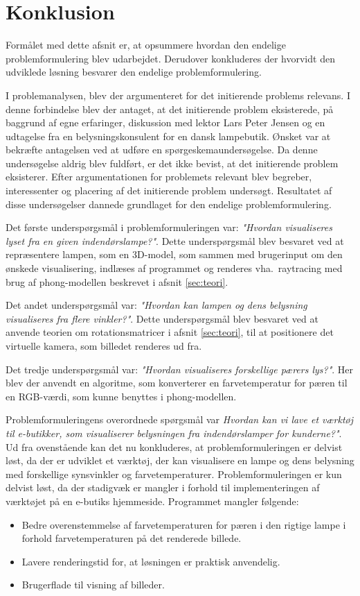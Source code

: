 \section{Konklusion}
Formålet med dette afsnit er, at opsummere hvordan den endelige problemformulering blev udarbejdet. Derudover konkluderes der hvorvidt den udviklede løsning besvarer den endelige problemformulering.

I problemanalysen, blev der argumenteret for det initierende problems relevans. I denne forbindelse blev der antaget, at det initierende problem eksisterede, på baggrund af egne erfaringer, diskussion med lektor Lars Peter Jensen og en udtagelse fra en belysningskonsulent for en dansk lampebutik. Ønsket var at bekræfte antagelsen ved at udføre en spørgeskemaundersøgelse. Da denne undersøgelse aldrig blev fuldført, er det ikke bevist, at det initierende problem eksisterer.
Efter argumentationen for problemets relevant blev begreber, interessenter og placering af det initierende problem undersøgt. Resultatet af disse undersøgelser dannede grundlaget for den endelige problemformulering.

Det første underspørgsmål i problemformuleringen var: \textit{"Hvordan visualiseres lyset fra en given indendørslampe?"}. Dette underspørgsmål blev besvaret ved at repræsentere lampen, som en 3D-model, som sammen med brugerinput om den ønskede visualisering, indlæses af programmet og renderes vha.\ raytracing med brug af phong-modellen beskrevet i afsnit \ref{sec:teori}.

Det andet underspørgsmål var: \textit{"Hvordan kan lampen og dens belysning visualiseres fra flere vinkler?"}. Dette underspørgsmål blev besvaret ved at anvende teorien om rotationsmatricer i afsnit \ref{sec:teori}, til at positionere det virtuelle kamera, som billedet renderes ud fra.

Det tredje underspørgsmål var: \textit{"Hvordan visualiseres forskellige pærers lys?"}. Her blev der anvendt en algoritme, som konverterer en farvetemperatur for pæren til en RGB-værdi, som kunne benyttes i phong-modellen.

Problemformuleringens overordnede spørgsmål var \textit{Hvordan kan vi lave et værktøj til e-butikker, som visualiserer belysningen fra indendørslamper for kunderne?"}. Ud fra ovenstående kan det nu konkluderes, at problemformuleringen er delvist løst, da der er udviklet et værktøj, der kan visualisere en lampe og dens belysning med forskellige synsvinkler og farvetemperaturer. Problemformuleringen er kun delvist løst, da der stadigvæk er mangler i forhold til implementeringen af værktøjet på en e-butiks hjemmeside. Programmet mangler følgende:

\begin{itemize}
\item Bedre overenstemmelse af farvetemperaturen for pæren i den rigtige lampe i forhold farvetemperaturen på det renderede billede.
\item Lavere renderingstid for, at løsningen er praktisk anvendelig.
\item Brugerflade til visning af billeder.
\end{itemize}

\clearpage